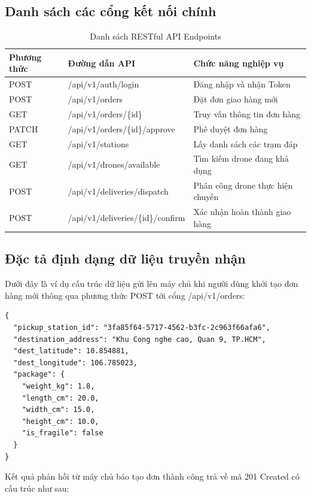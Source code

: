 \subsection{Danh sách các cổng kết nối chính}
\begin{table}[htbp]
	\centering
	\begin{tabular}{|l|l|l|}
		\hline
		\textbf{Phương thức} & \textbf{Đường dẫn API} & \textbf{Chức năng nghiệp vụ} \\ \hline
		POST & /api/v1/auth/login & Đăng nhập và nhận Token \\ \hline
		POST & /api/v1/orders & Đặt đơn giao hàng mới \\ \hline
		GET & /api/v1/orders/\{id\} & Truy vấn thông tin đơn hàng \\ \hline
		PATCH & /api/v1/orders/\{id\}/approve & Phê duyệt đơn hàng \\ \hline
		GET & /api/v1/stations & Lấy danh sách các trạm đáp \\ \hline
		GET & /api/v1/drones/available & Tìm kiếm drone đang khả dụng \\ \hline
		POST & /api/v1/deliveries/dispatch & Phân công drone thực hiện chuyến \\ \hline
		POST & /api/v1/deliveries/\{id\}/confirm & Xác nhận hoàn thành giao hàng \\ \hline
	\end{tabular}
	\caption{Danh sách RESTful API Endpoints}
\end{table}

\subsection{Đặc tả định dạng dữ liệu truyền nhận}

\noindent Dưới đây là ví dụ cấu trúc dữ liệu gửi lên máy chủ khi người dùng khởi tạo đơn hàng mới thông qua phương thức POST tới cổng /api/v1/orders:

\begin{verbatim}
{
  "pickup_station_id": "3fa85f64-5717-4562-b3fc-2c963f66afa6",
  "destination_address": "Khu Cong nghe cao, Quan 9, TP.HCM",
  "dest_latitude": 10.854881,
  "dest_longitude": 106.785023,
  "package": {
    "weight_kg": 1.8,
    "length_cm": 20.0,
    "width_cm": 15.0,
    "height_cm": 10.0,
    "is_fragile": false
  }
}
\end{verbatim}

\noindent Kết quả phản hồi từ máy chủ báo tạo đơn thành công trả về mã 201 Created có cấu trúc như sau:

